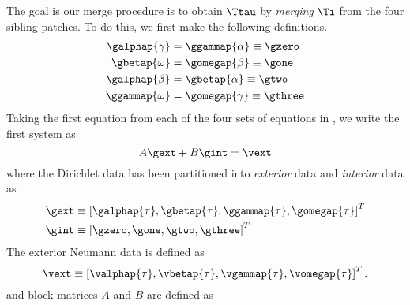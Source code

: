 
The goal is our merge procedure is to obtain $\Ttau$ by {\em merging} $\Ti$ from the four sibling patches. To do this, we first make the following definitions. 
\begin{equation}
\begin{aligned}
\galphap{\gamma} & = \ggammap{\alpha} \equiv \gzero \\
\gbetap{\omega} & = \gomegap{\beta} \equiv \gone \\
\galphap{\beta} & = \gbetap{\alpha} \equiv \gtwo \\
\ggammap{\omega} & = \gomegap{\gamma} \equiv \gthree \\
\end{aligned}
\end{equation}
Taking the first equation from each of the four sets of equations in , we write the first system as
\begin{equation}
A\gext + B \gint = \vext
\end{equation}
where the Dirichlet data has been partitioned into {\em exterior} data and {\em interior} data as
\begin{equation}
\begin{aligned}
\gext & \equiv \left[\galphap{\tau}, \gbetap{\tau} , \ggammap{\tau}, \gomegap{\tau}\right]^T \\
\gint & \equiv \left[\gzero, \gone, \gtwo, \gthree\right]^T \\
\end{aligned}
\end{equation}
The exterior Neumann data is defined as
\begin{equation}
\vext \equiv \left[\valphap{\tau}, \vbetap{\tau} , \vgammap{\tau}, \vomegap{\tau}\right]^T.
\end{equation}
and block matrices $A$ and $B$ are defined as
